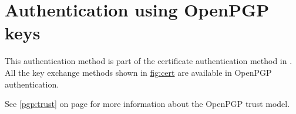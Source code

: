 \section{Authentication using OpenPGP keys}
\label{sec:pgp}

This authentication method is part of the certificate authentication
method in \gnutls{}. All the key exchange methods shown in \hyperref{figure}{figure }{}{fig:cert} are
available in OpenPGP authentication. 

See \ref{pgp:trust} on page \pageref{pgp:trust} for more information 
about the OpenPGP trust model.
